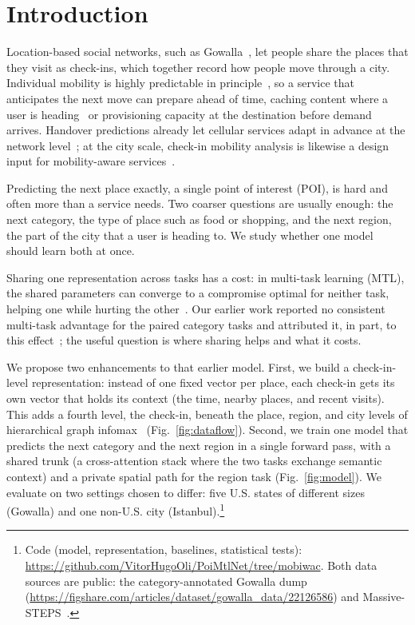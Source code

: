\section{Introduction}
\label{sec:intro}

Location-based social networks, such as Gowalla~\cite{cho2011gowalla}, let people share the places that they visit as check-ins, which together record how people move through a city. Individual mobility is highly predictable in principle~\cite{song2010limits}, so a service that anticipates the next move can prepare ahead of time, caching content where a user is heading~\cite{bastug2014edge} or provisioning capacity at the destination before demand arrives. Handover predictions already let cellular services adapt in advance at the network level~\cite{vielhaus2022handover}; at the city scale, check-in mobility analysis is likewise a design input for mobility-aware services~\cite{moura2025mobilityaware}.

Predicting the next place exactly, a single point of interest (POI), is hard and often more than a service needs. Two coarser questions are usually enough: the next category, the type of place such as food or shopping, and the next region, the part of the city that a user is heading to. We study whether one model should learn both at once.

Sharing one representation across tasks has a cost: in multi-task learning (MTL), the shared parameters can converge to a compromise optimal for neither task, helping one while hurting the other~\cite{caruana1997multitask}. Our earlier
work reported no consistent multi-task advantage for the paired category tasks and attributed it, in part, to this effect~\cite{silva2025mtlnet}; the useful question is where sharing helps and what it costs.

We propose two enhancements to that earlier model. First, we build a check-in-level representation: instead of one fixed vector per place, each check-in gets its own vector that holds its context (the time, nearby places, and recent visits).
This adds a fourth level, the check-in, beneath the place, region, and city levels of hierarchical graph infomax~\cite{huang2023hgi,velickovic2019dgi} (Fig.~\ref{fig:dataflow}). Second, we train one model that
predicts the next category and the next region in a single forward pass, with a shared trunk (a cross-attention stack where the two tasks exchange
semantic context) and a private spatial path for the region task (Fig.~\ref{fig:model}). We evaluate on two settings chosen to differ: five U.S. states of different sizes (Gowalla) and one non-U.S. city (Istanbul).\footnote{\label{fn:code}Code (model, representation, baselines, statistical tests): \url{https://github.com/VitorHugoOli/PoiMtlNet/tree/mobiwac}. Both data sources are public: the category-annotated Gowalla dump (\url{https://figshare.com/articles/dataset/gowalla_data/22126586}) and Massive-STEPS~\cite{wongso2025massivesteps}.}

